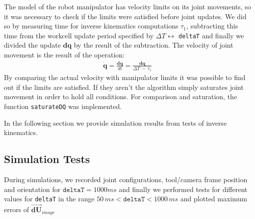 \documentclass[]{scrartcl}
\begin{document}
The model of the robot manipulator has velocity limits on its joint movements, so it was necessary to check if the limits were satisfied before joint updates. We did so by measuring time for inverse kinematics computations $\tau_1$, subtracting this time from the workcell update period specified by $\Delta T \longleftrightarrow$ \texttt{deltaT} and finally we divided the update $\boldsymbol{dq}$ by the result of the subtraction. The velocity of joint movement is the result of the operation:
\begin{align}
	\boldsymbol{\dot{q}} = \frac{\boldsymbol{dq}}{dt} = \frac{\boldsymbol{dq}}{\Delta T\, -\, \tau_1}
\end{align}
By comparing the actual velocity with manipulator limits it was possible to find out if the limits are satisfied. If they aren't the algorithm simply saturates joint movement in order to hold all conditions. For comparison and saturation, the function \texttt{saturateDQ} was implemented.

In the following section we provide simulation results from tests of inverse kinematics.

\subsection{Simulation Tests}
During simulations, we recorded joint configurations, tool/camera frame position and orientation for $\texttt{deltaT} = 1000 ms$ and finally we performed tests for different values for \texttt{deltaT} in the range $50\, ms < \texttt{deltaT} < 1000\, ms$ and plotted maximum errors of 
$\overrightarrow{\boldsymbol{dU}}_{image}$
\end{document}
